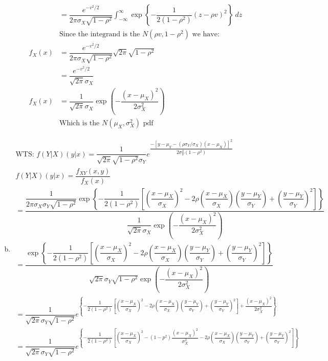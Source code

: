 \documentclass{article}
\begin{document}
\begin{flushleft}
\begin{enumerate}[(a)]
\begin{align*}
&=\dfrac{e^{-v^2/2}}{2\pi \sigma_X \sqrt{1-\rho^2}}\int_{-\infty}^{\infty}\exp{\left\{-\dfrac{1}{2(1-\rho^2)}(z-\rho v)^2 \right\}} \ dz\\
&\text{Since the integrand is the } N(\rho v,1-\rho^2) \text{ we have:}\\
f_X(x)&=\dfrac{e^{-v^2/2}}{2\pi \sigma_X \sqrt{1-\rho^2}}\sqrt{2\pi}\sqrt{1-\rho^2}\\
&=\dfrac{e^{-v^2/2}}{\sqrt{2\pi} \sigma_X }\\
f_X(x)&=\dfrac{1}{\sqrt{2\pi}\sigma_X}\exp{\left(-\dfrac{(x-\mu_X)^2}{2\sigma_X^2}\right)}\\
&\text{Which is the } N(\mu_X,\sigma^2_X) \text{ pdf}
\end{align*}
\item 
\begin{multline*}
\text{WTS: } f(Y|X)(y|x)=\dfrac{1}{\sqrt{2\pi}\sqrt{1-\rho^2}\sigma_Y}e^{\dfrac{-[y-\mu_Y-(\rho\sigma_Y /\sigma_X)(x-\mu_X)]^2}{2\sigma^2_Y(1-\rho^2)}}\\
f(Y|X)(y|x)=\dfrac{f_{XY}(x,y)}{f_X(x)}\\
=\dfrac{\dfrac{1}{2\pi \sigma_X \sigma_Y \sqrt{1-\rho^2}}
	\exp{\left\{-\dfrac{1}{2(1-\rho^2)}\left[\left(\dfrac{x-\mu_X}{\sigma_X} \right)^2- 2\rho \left(\dfrac{x-\mu_X}{\sigma_X} \right)\left(\dfrac{y-\mu_Y}{\sigma_Y} \right)+\left(\dfrac{y-\mu_Y}{\sigma_Y} \right)^2 \right] \right\}}}{\dfrac{1}{\sqrt{2\pi}\sigma_X}\exp{\left(-\dfrac{(x-\mu_X)^2}{2\sigma_X^2}\right)}}\\
=\dfrac{\exp{\left\{-\dfrac{1}{2(1-\rho^2)}\left[\left(\dfrac{x-\mu_X}{\sigma_X} \right)^2- 2\rho \left(\dfrac{x-\mu_X}{\sigma_X} \right)\left(\dfrac{y-\mu_Y}{\sigma_Y} \right)+\left(\dfrac{y-\mu_Y}{\sigma_Y} \right)^2 \right] \right\}}}{\sqrt{2\pi}\sigma_Y \sqrt{1-\rho^2}\exp{\left(-\dfrac{(x-\mu_X)^2}{2\sigma_X^2}\right)}}\\
=\dfrac{1}{\sqrt{2\pi}\sigma_Y \sqrt{1-\rho^2}}e^{\left\{-\dfrac{1}{2(1-\rho^2)}\left[\left(\dfrac{x-\mu_X}{\sigma_X} \right)^2- 2\rho \left(\dfrac{x-\mu_X}{\sigma_X} \right)\left(\dfrac{y-\mu_Y}{\sigma_Y} \right)+\left(\dfrac{y-\mu_Y}{\sigma_Y} \right)^2 \right]+\dfrac{(x-\mu_X)^2}{2\sigma_X^2} \right\}}\\
=\dfrac{1}{\sqrt{2\pi}\sigma_Y \sqrt{1-\rho^2}}e^{\left\{-\dfrac{1}{2(1-\rho^2)}\left[\left(\dfrac{x-\mu_X}{\sigma_X} \right)^2-(1-p^2)\dfrac{(x-\mu_X)^2}{\sigma_X^2}- 2\rho \left(\dfrac{x-\mu_X}{\sigma_X} \right)\left(\dfrac{y-\mu_Y}{\sigma_Y} \right)+\left(\dfrac{y-\mu_Y}{\sigma_Y} \right)^2 \right] \right\}}\\

\end{multline*}
\end{enumerate}
\end{flushleft}
\end{document}
